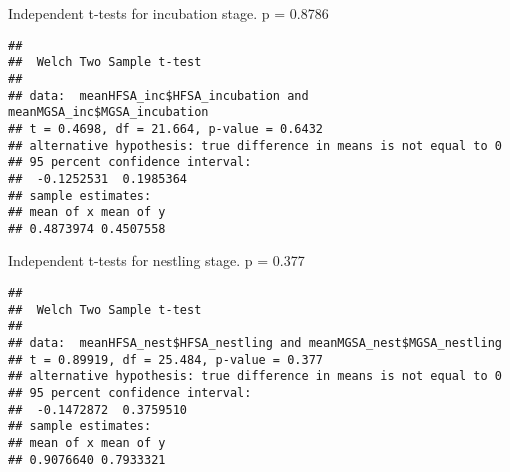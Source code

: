 \documentclass[
]{article}
\newenvironment{Shaded}{\begin{snugshade}}{\end{snugshade}}
\newcommand{\FunctionTok}[1]{\textcolor[rgb]{0.00,0.00,0.00}{#1}}
\newcommand{\NormalTok}[1]{#1}
\newcommand{\SpecialCharTok}[1]{\textcolor[rgb]{0.00,0.00,0.00}{#1}}
\begin{document}
Independent t-tests for incubation stage. p = 0.8786

\begin{Shaded}
\end{Shaded}

\begin{verbatim}
## 
##  Welch Two Sample t-test
## 
## data:  meanHFSA_inc$HFSA_incubation and meanMGSA_inc$MGSA_incubation
## t = 0.4698, df = 21.664, p-value = 0.6432
## alternative hypothesis: true difference in means is not equal to 0
## 95 percent confidence interval:
##  -0.1252531  0.1985364
## sample estimates:
## mean of x mean of y 
## 0.4873974 0.4507558
\end{verbatim}

Independent t-tests for nestling stage. p = 0.377

\begin{Shaded}
\end{Shaded}

\begin{verbatim}
## 
##  Welch Two Sample t-test
## 
## data:  meanHFSA_nest$HFSA_nestling and meanMGSA_nest$MGSA_nestling
## t = 0.89919, df = 25.484, p-value = 0.377
## alternative hypothesis: true difference in means is not equal to 0
## 95 percent confidence interval:
##  -0.1472872  0.3759510
## sample estimates:
## mean of x mean of y 
## 0.9076640 0.7933321
\end{verbatim}

  
\end{document}
